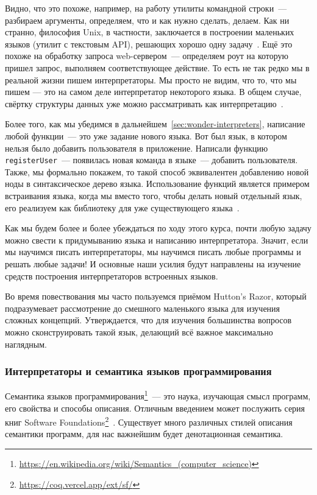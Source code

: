 Видно, что это похоже, например, на работу утилиты командной строки~--- разбираем аргументы, определяем, что и как нужно сделать, делаем.
Как ни странно, философия Unix, в частности, заключается в построении маленьких языков (утилит с текстовым API), решающих хорошо одну задачу~\cite{bentley1986little}.
Ещё это похоже на обработку запроса web-сервером~--- определяем роут на которую пришел запрос, выполняем соответствующее действие.
То есть не так редко мы в реальной жизни пишем интерпретаторы.
Мы просто не видим, что то, что мы пишем --- это на самом деле интерпретатор некоторого языка.
В общем случае, свёртку структуры данных уже можно рассматривать как интерпретацию~\cite{gibbons2014folding}.

Более того, как мы убедимся в дальнейшем~\ref{sec:wonder-interpreters}, написание любой функции~--- это уже задание нового языка.
Вот был язык, в котором нельзя было добавить пользователя в приложение.
Написали функцию \texttt{registerUser}~--- появилась новая команда в языке~--- добавить пользователя.
Также, мы формально покажем, то такой способ эквивалентен добавлению новой ноды в синтаксическое дерево языка.
Использование функций является примером встраивания языка, когда мы вместо того, чтобы делать новый отдельный язык, его реализуем как библиотеку для уже существующего языка~\cite{gibbons2013functional}.

Как мы будем более и более убеждаться по ходу этого курса, почти любую задачу можно свести к придумыванию языка и написанию интерпретатора.
Значит, если мы научимся писать интерпретаторы, мы научимся писать любые программы и решать любые задачи!
И основные наши усилия будут направлены на изучение средств построения интерпретаторов встроенных языков.

Во время повествования мы часто пользуемся приёмом Hutton's Razor, который подразумевает рассмотрение до смешного маленького языка для изучения сложных концепций.
Утверждается, что для изучения большинства вопросов можно сконструировать такой язык, делающий всё важное максимально наглядным.

\subsubsection{Интерпретаторы и семантика языков программирования} \label{subsec:semantics}

Семантика языков программирования\footnote{\url{https://en.wikipedia.org/wiki/Semantics_(computer_science)}\label{note:sema-wiki}}~--- это наука, изучающая смысл программ, его свойства и способы описания.
Отличным введением может послужить серия книг Software Foundations\footnote{\url{https://coq.vercel.app/ext/sf/}}~\cite{pierce2010software}.
Существует много различных стилей описания семантики программ, для нас важнейшим будет денотационная семантика.

